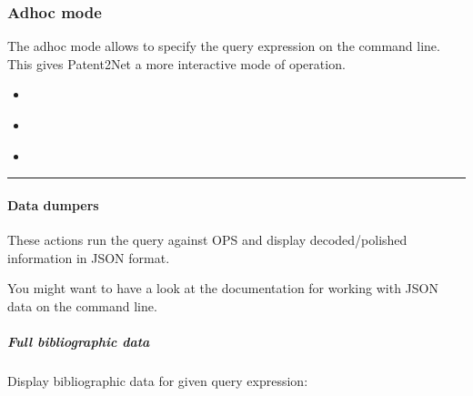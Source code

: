\documentclass[letterpaper,10pt,english]{sphinxmanual}
\begin{document}
\subsubsection{Ad\sphinxhyphen{}hoc mode}
\label{\detokenize{usage/adhoc:ad-hoc-mode}}\label{\detokenize{usage/adhoc::doc}}
The ad\sphinxhyphen{}hoc mode allows to specify the query expression on the command line.
This gives Patent2Net a more interactive mode of operation.

\begin{sphinxShadowBox}
\begin{itemize}
\item {} 
\label{\detokenize{usage/adhoc:id1}}{\hyperref[\detokenize{usage/adhoc:data-dumpers}]{}}

\item {} 
\label{\detokenize{usage/adhoc:id2}}{\hyperref[\detokenize{usage/adhoc:data-formatters}]{}}

\item {} 
\label{\detokenize{usage/adhoc:id3}}{\hyperref[\detokenize{usage/adhoc:synopsis}]{}}

\end{itemize}
\end{sphinxShadowBox}


\bigskip\hrule\bigskip



\paragraph{Data dumpers}
\label{\detokenize{usage/adhoc:data-dumpers}}
These actions run the query against OPS and display decoded/polished information in JSON format.

You might want to have a look at the  documentation for working with JSON data on the command line.


\subparagraph{Full bibliographic data}
\label{\detokenize{usage/adhoc:full-bibliographic-data}}
Display bibliographic data for given query expression:

\begin{sphinxVerbatim}[commandchars=\\\{\}]
   
\end{sphinxVerbatim}
\end{document}
